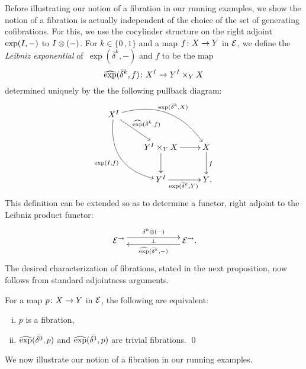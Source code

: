 \documentclass[reqno,10pt,a4paper,oneside,draft]{amsart}
\begin{document}
 
Before illustrating our notion of a fibration in our running examples,  we show the notion of a fibration is actually independent of the choice of the set of generating cofibrations. For this, we use the cocylinder structure on the right adjoint $\exp(\interval, -)$ to $\interval \otimes (-)$.
For $k \in \{ 0 \, , 1 \}$ and a map $f \co X \to Y$ in $\calE$, we define the \emph{Leibniz exponential} 
of~$\exp(\bar{\delta}^k, -)$ and $f$ to be the map
\[
\hatexp(\bar{\delta}^k, f) \co X^\interval \to Y^\interval \times_{Y} X
\]
determined uniquely by the the following pullback diagram:
\begin{equation} \label{hatexp-delta-definition}
\begin{gathered}
\xymatrix{
X^\interval \ar@/^2pc/[drr]^-{\exp(\bar{\delta}^k, X)}  \ar@/_2pc/[ddr]_{\exp(\interval, f)} \ar[dr]^-{\hatexp(\bar{\delta}^k, f)} &  & \\
  &   Y^\interval \times_{Y} X    \ar[d] \ar[r]  & X \ar[d]^f \\
  & Y^\interval \ar[r]_{\exp(\bar{\delta}^k, Y)} & Y \rlap{.} }
\end{gathered}
\end{equation}
This definition can be extended so as to determine a functor, right adjoint to the Leibniz product functor:
\begin{equation}
\label{equ:leibniz-prod-exp}
\xymatrix@C+4em{
  \catE^\to
  \ar@<1ex>[r]^{\kcyl \hatotimes (-)}
  \ar@{}[r]|{\bot}
&
  \catE^\to
  \ar@<1ex>[l]^{\hatexp(\bar{\delta}^k, -)}
\rlap{.}}
\end{equation}
The desired characterization of fibrations, stated in the next proposition, now follows from standard adjointness arguments.


\begin{proposition} \label{thm:char-fib-nonalg} For a map $p \co X \to Y$ in $\cal{E}$, the following are equivalent:
\begin{enumerate}[(i)]
\item $p$ is a fibration,
\item $\hatexp(\bar{\lcyl}, p)$ and $\hatexp(\bar{\rcyl}, p)$ are trivial fibrations. \qed
\end{enumerate} 
\end{proposition}


We now illustrate our notion of a fibration in our running examples.
\end{document}

